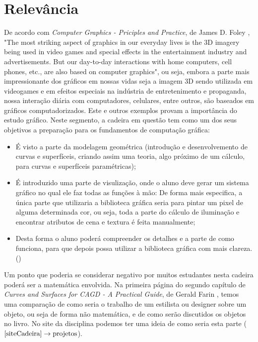 \documentclass[a4paper]{article}
\begin{document}
\section*{Relevância}
De acordo com \textit{Computer Graphics - Priciples and Practice}, de James D. Foley \cite{ComputacaoGrafica}, "The most striking aspect of graphics in our everyday lives is the 3D imagery being used in video games and special effects in the entertainment industry and advertisements. But our day-to-day interactions with home computers, cell phones, etc., are also based on computer graphics", ou seja, embora a parte mais impressionante dos gráficos em nossas vidas seja a imagem 3D sendo utilizada em videogames e em efeitos especiais na indústria de entretenimento e propaganda, nossa interação diária com computadores, celulares, entre outros, são baseados em gráficos computadorizados. Este e outros exemplos provam a importância do estudo gráfico.\linebreak
Neste segmento, a cadeira em questão tem como um dos seus objetivos a preparação para os fundamentos de computação gráfica:
\begin{itemize}
\item É visto a parte da modelagem geométrica (introdução e desenvolvemento de curvas e superfíceis, criando assim uma teoria, algo próximo de um cálculo, para curvas e superfíceis paramétricas);
\item É introduzido uma parte de visulização, onde o aluno deve gerar um sistema gráfico no qual ele faz todas as funções à mão: De forma mais especifica, a única parte que utilizaria a biblioteca gráfica seria para pintar um pixel de alguma determinada cor, ou seja, toda a parte do cálculo de iluminação e encontrar atributos de cena e textura é feita manualmente;
\item Desta forma o aluno poderá compreender os detalhes e a parte de como funciona, para que depois possa utilizar a biblioteca gráfica com mais clareza.
(\cite{Silvio})
\end{itemize}
Um ponto que poderia se considerar negativo por muitos estudantes nesta cadeira poderá ser a matemática envolvida. Na primeira página do segundo capítulo de \textit{Curves and Surfaces for CAGD - A Practical Guide}, de Gerald Farin \cite{CurvaseSuperficeis}, temos uma comparação de como seria o trabalho de um estilista ou designer sobre um objeto, ou seja de forma não matemática, e de como serão discutidos os objetos no livro. No site da disciplina podemos ter uma ideia de como seria esta parte (\(\text{\cite{siteCadeira}} \rightarrow \text{projetos}\)).
\end{document}
